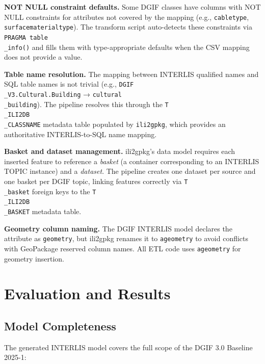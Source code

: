 \documentclass[conference]{IEEEtran}
\begin{document}
\textbf{NOT NULL constraint defaults.} Some DGIF classes have columns with NOT NULL constraints for attributes not covered by the mapping (e.g., \texttt{cabletype}, \texttt{surfacematerialtype}). The transform script auto-detects these constraints via \texttt{PRAGMA table\\_info()} and fills them with type-appropriate defaults when the CSV mapping does not provide a value.

\textbf{Table name resolution.} The mapping between INTERLIS qualified names and SQL table names is not trivial (e.g., \texttt{DGIF\\_V3.Cultural.Building} → \texttt{cultural\\_building}). The pipeline resolves this through the \texttt{T\\_ILI2DB\\_CLASSNAME} metadata table populated by \texttt{ili2gpkg}, which provides an authoritative INTERLIS-to-SQL name mapping.

\textbf{Basket and dataset management.} ili2gpkg's data model requires each inserted feature to reference a \textit{basket} (a container corresponding to an INTERLIS TOPIC instance) and a \textit{dataset}. The pipeline creates one dataset per source and one basket per DGIF topic, linking features correctly via \texttt{T\\_basket} foreign keys to the \texttt{T\\_ILI2DB\\_BASKET} metadata table.

\textbf{Geometry column naming.} The DGIF INTERLIS model declares the attribute as \texttt{geometry}, but ili2gpkg renames it to \texttt{ageometry} to avoid conflicts with GeoPackage reserved column names. All ETL code uses \texttt{ageometry} for geometry insertion.



\section{Evaluation and Results}

\subsection{Model Completeness}

The generated INTERLIS model covers the full scope of the DGIF 3.0 Baseline 2025-1:
\end{document}
